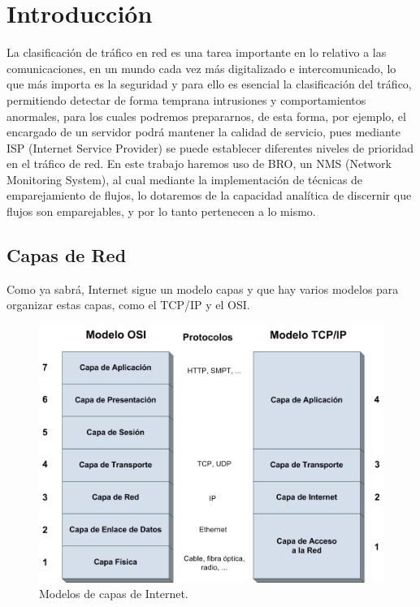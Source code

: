 \chapter{Introducción}

La clasificación de tráfico en red es una tarea importante 
en lo relativo a las comunicaciones, en un mundo cada vez 
más digitalizado e intercomunicado, lo que más importa es 
la seguridad y para ello es esencial la clasificación del 
tráfico, permitiendo detectar de forma temprana intrusiones 
y comportamientos anormales, para los cuales podremos 
prepararnos, de esta forma, por ejemplo, el encargado de un 
servidor podrá mantener la calidad de servicio, pues mediante 
ISP (Internet Service Provider) se puede establecer diferentes 
niveles de prioridad en el tráfico de red.
\intro
En este trabajo haremos uso de BRO, un NMS (Network Monitoring System), 
al cual mediante la implementación de técnicas de emparejamiento de 
flujos, lo dotaremos de la capacidad analítica de discernir que flujos 
son emparejables, y por lo tanto pertenecen a lo mismo.

\section{Capas de Red}

Como ya sabrá, Internet sigue un modelo capas y que hay varios modelos para 
organizar estas capas, como el TCP/IP y el OSI.

\begin{figure}[H]
  \includegraphics[width=1\textwidth]{imagenes/capas.png}
  \centering
  \caption{Modelos de capas de Internet.}
\end{figure}

